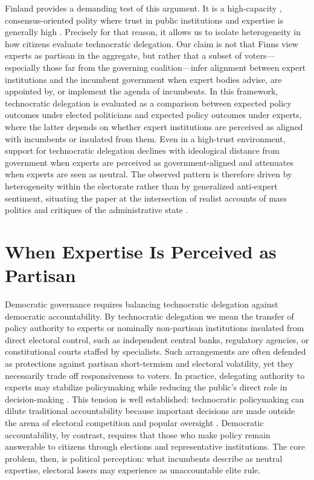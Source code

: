 \documentclass[11pt]{article}\usepackage[]{graphicx}\usepackage[]{xcolor}
\begin{document}
Finland provides a demanding test of this argument. It is a high-capacity \parencite{Bahamonde2021}, consensus-oriented polity where trust in public institutions and expertise is generally high  \parencite[18]{Koiranen2025}. Precisely for that reason, it allows us to isolate heterogeneity in how citizens evaluate technocratic delegation. Our claim is not that Finns view experts as partisan in the aggregate, but rather that a subset of voters---especially those far from the governing coalition---infer alignment between expert institutions and the incumbent government when expert bodies advise, are appointed by, or implement the agenda of incumbents. In this framework, technocratic delegation is evaluated as a comparison between expected policy outcomes under elected politicians and expected policy outcomes under experts, where the latter depends on whether expert institutions are perceived as aligned with incumbents or insulated from them. Even in a high-trust environment, support for technocratic delegation declines with ideological distance from government when experts are perceived as government-aligned and attenuates when experts are seen as neutral. The observed pattern is therefore driven by heterogeneity within the electorate rather than by generalized anti-expert sentiment, situating the paper at the intersection of realist accounts of mass politics \parencite{Achen2016} and critiques of the administrative state \parencite{Hamburger2014, Glennon2014, Majone1994}.


\section{When Expertise Is Perceived as Partisan}

Democratic governance requires balancing technocratic delegation against democratic accountability. By technocratic delegation we mean the transfer of policy authority to experts or nominally non-partisan institutions insulated from direct electoral control, such as independent central banks, regulatory agencies, or constitutional courts staffed by specialists. Such arrangements are often defended as protections against partisan short-termism and electoral volatility, yet they necessarily trade off responsiveness to voters. In practice, delegating authority to experts may stabilize policymaking while reducing the public's direct role in decision-making \parencite{Caramani2017}. This tension is well established: technocratic policymaking can dilute traditional accountability because important decisions are made outside the arena of electoral competition and popular oversight \parencite{Bertsou2020}. Democratic accountability, by contrast, requires that those who make policy remain answerable to citizens through elections and representative institutions. The core problem, then, is political perception: what incumbents describe as neutral expertise, electoral losers may experience as unaccountable elite rule.
\end{document}

